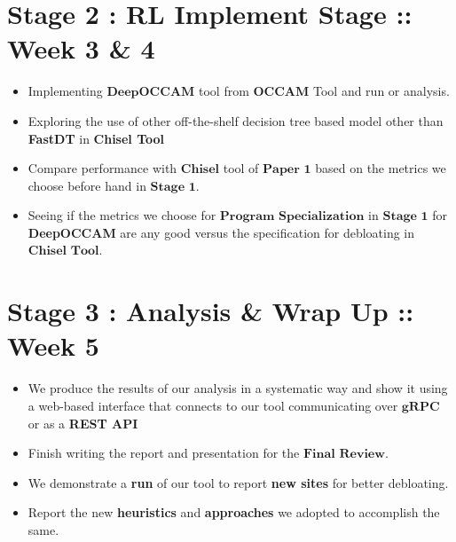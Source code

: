 \documentclass{article} %
\begin{document}
\section*{Stage 2 : RL Implement Stage :: Week 3 \& 4} 
\begin{itemize}
    \item Implementing $\textbf{DeepOCCAM}$ tool from $\textbf{OCCAM}$ Tool and run or analysis. 
    \item Exploring the use of other off-the-shelf decision tree based model other than \textbf{FastDT} in \textbf{Chisel Tool} 
    \item Compare performance with $\textbf{Chisel}$ tool of $\textbf{Paper 1}$ based on the metrics we choose before hand in $\textbf{Stage 1}$. 
    \item Seeing if the metrics we choose for $\textbf{Program Specialization}$ in $\textbf{Stage 1}$ for \textbf{DeepOCCAM} are any good versus the specification for debloating in $\textbf{Chisel Tool}$.  
\end{itemize}

\section*{Stage 3 : Analysis \& Wrap Up :: Week 5}
\begin{itemize}
    \item We produce the results of our analysis in a systematic way and show it using a web-based interface that connects to our tool communicating over $\textbf{gRPC}$ or as a \textbf{REST API}
    \item Finish writing the report and presentation for the $\textbf{Final Review}$. 
    \item We demonstrate a \textbf{run} of our tool to report \textbf{new sites} for better debloating. 
    \item Report the new \textbf{heuristics} and \textbf{approaches} we adopted to accomplish the same. 
\end{itemize}
\end{document}
